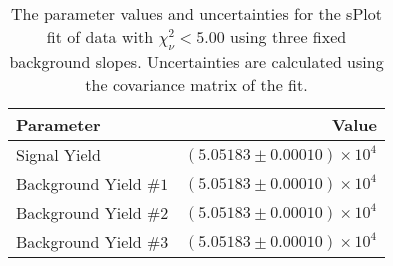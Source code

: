 
\begin{table}[ht]
    \begin{center}
        \begin{tabular}{lr}\toprule
            Parameter & Value \\\midrule
            Signal Yield & $(5.05183 \pm 0.00010) \times 10^{4}$ \\
            Background Yield $\#1$ & $(5.05183 \pm 0.00010) \times 10^{4}$ \\
            Background Yield $\#2$ & $(5.05183 \pm 0.00010) \times 10^{4}$ \\
            Background Yield $\#3$ & $(5.05183 \pm 0.00010) \times 10^{4}$ \\\bottomrule
        \end{tabular}
        \caption{The parameter values and uncertainties for the sPlot fit of data with $\chi^2_\nu < 5.00$ using three fixed background slopes. Uncertainties are calculated using the covariance matrix of the fit.}\label{tab:splot-fit-results-chisqdof-5.00-fixed-3}
    \end{center}
\end{table}
